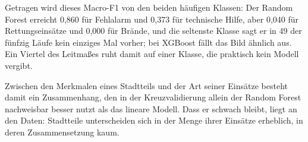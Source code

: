 \documentclass[12pt,a4paper]{article}
\begin{document}
Getragen wird dieses Macro-F1 von den beiden häufigen Klassen: Der Random Forest erreicht 0,860 für Fehlalarm und 0,373 für technische Hilfe, aber 0,040 für Rettungseinsätze und 0,000 für Brände, und die seltenste Klasse sagt er in 49 der fünfzig Läufe kein einziges Mal vorher; bei XGBoost fällt das Bild ähnlich aus. Ein Viertel des Leitmaßes ruht damit auf einer Klasse, die praktisch kein Modell vergibt.
 
Zwischen den Merkmalen eines Stadtteils und der Art seiner Einsätze besteht damit ein Zusammenhang, den in der Kreuzvalidierung allein der Random Forest nachweisbar besser nutzt als das lineare Modell. Dass er schwach bleibt, liegt an den Daten: Stadtteile unterscheiden sich in der Menge ihrer Einsätze erheblich, in deren Zusammensetzung kaum.

%
%
%
%
\end{document}
